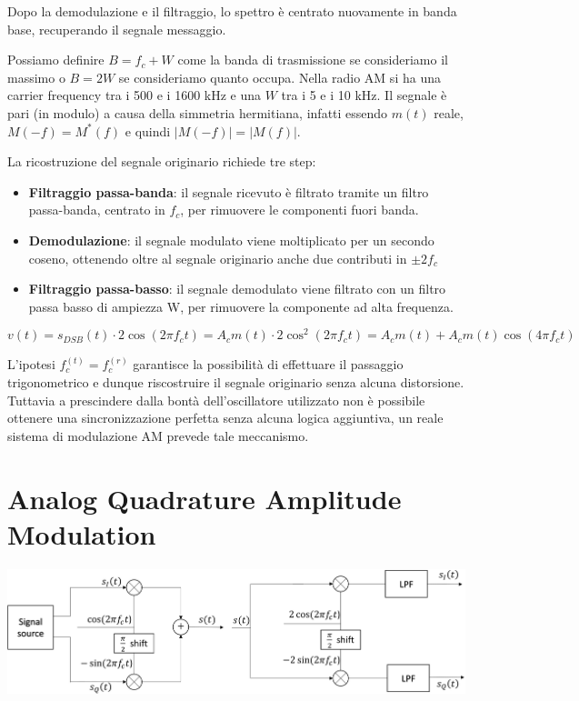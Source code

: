Dopo la demodulazione e il filtraggio, lo spettro è centrato nuovamente in banda base, recuperando il segnale messaggio.

Possiamo definire $B = f_c + W$ come la banda di trasmissione se consideriamo il massimo o $B = 2W$ se consideriamo quanto occupa.
Nella radio AM si ha una carrier frequency tra i 500 e i 1600 kHz e una $W$ tra i 5 e i 10 kHz.
Il segnale è pari (in modulo) a causa della simmetria hermitiana, infatti essendo $m(t)$ reale, $M(-f) = M^*(f)$ e quindi $|M(-f)| = |M(f)|$.


La ricostruzione del segnale originario richiede tre step:
\begin{itemize}
  \item \textbf{Filtraggio passa-banda}: il segnale ricevuto è filtrato tramite un filtro passa-banda, centrato in \( f_c \), per rimuovere le componenti fuori banda.
  \item \textbf{Demodulazione}: il segnale modulato viene moltiplicato per un secondo coseno, ottenendo oltre al segnale originario anche due contributi in \(\pm 2f_c \)
  \item \textbf{Filtraggio passa-basso}: il segnale demodulato viene filtrato con un filtro passa basso di ampiezza W, per rimuovere la componente ad alta frequenza.
\end{itemize}

\begin{equation*}
    v(t) = s_{DSB}(t) \cdot 2\cos(2\pi f_c t) = A_c m(t) \cdot 2\cos^2(2\pi f_c t) = A_c m(t) + A_c m(t) \cos(4\pi f_c t)
\end{equation*}

L'ipotesi $f_c^{(t)} = f_c^{(r)}$ garantisce la possibilità di effettuare il passaggio trigonometrico e dunque riscostruire il segnale originario senza alcuna distorsione. Tuttavia a prescindere dalla bontà dell'oscillatore utilizzato non è possibile ottenere una sincronizzazione perfetta senza alcuna logica aggiuntiva, un reale sistema di modulazione AM prevede tale meccanismo.

\section*{Analog Quadrature Amplitude Modulation}

\begin{center}
    \includegraphics[width=1\textwidth]{imgs/analog_qam.png}
\end{center}

















